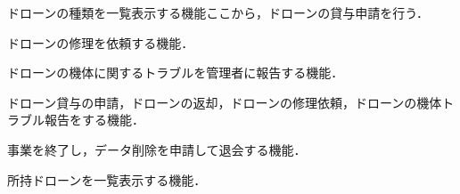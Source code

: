 \documentclass[a4paper, titlepage]{jsarticle}
\begin{document}
\begin{description}[labelwidth=\linewidth]


  \item [ドローン種類一覧機能] ドローンの種類を一覧表示する機能ここから，ドローンの貸与申請を行う．
  \item [ドローンの修理依頼機能] ドローンの修理を依頼する機能．
  \item [ドローンの機体トラブル報告] ドローンの機体に関するトラブルを管理者に報告する機能．
  \item [ドローン貸与申請機能] ドローン貸与の申請，ドローンの返却，ドローンの修理依頼，ドローンの機体トラブル報告をする機能．
  \item [退会機能] 事業を終了し，データ削除を申請して退会する機能．
  \item [所持ドローン一覧機能] 所持ドローンを一覧表示する機能．

\end{description}
\end{document}
